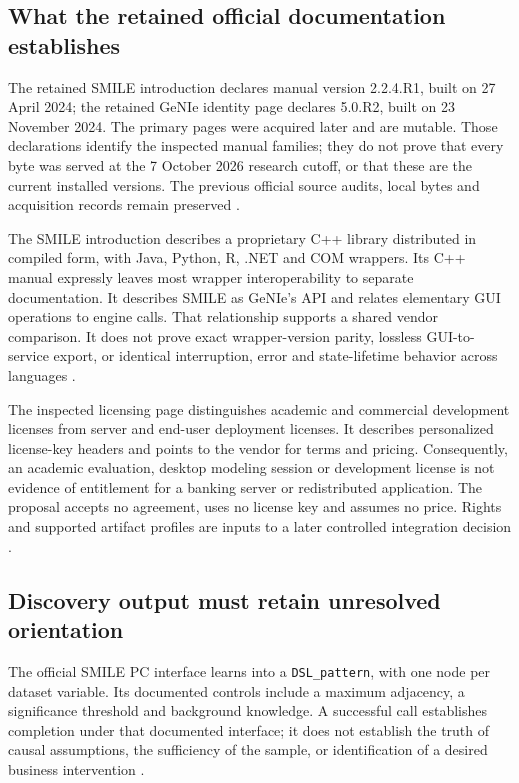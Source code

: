 \subsection{What the retained official documentation establishes}
The retained SMILE introduction declares manual version 2.2.4.R1, built on
27 April 2024; the retained GeNIe identity page declares 5.0.R2, built on
23 November 2024. The primary pages were acquired later and are mutable.
Those declarations identify the inspected manual families; they do not
prove that every byte was served at the 7 October 2026 research cutoff,
or that these are the current installed versions. The previous official
source audits, local bytes and acquisition records remain preserved
\cite{exec13_smile_intro,exec13_genie_readme,exec24_smile_choice}.

The SMILE introduction describes a proprietary C++ library distributed in
compiled form, with Java, Python, R, .NET and COM wrappers. Its C++ manual
expressly leaves most wrapper interoperability to separate documentation.
It describes SMILE as GeNIe's API and relates elementary GUI operations to
engine calls. That relationship supports a shared vendor comparison. It
does not prove exact wrapper-version parity, lossless GUI-to-service export,
or identical interruption, error and state-lifetime behavior across languages
\cite{exec13_smile_intro}.

The inspected licensing page distinguishes academic and commercial
development licenses from server and end-user deployment licenses. It
describes personalized license-key headers and points to the vendor for
terms and pricing. Consequently, an academic evaluation, desktop modeling
session or development license is not evidence of entitlement for a banking
server or redistributed application. The proposal accepts no agreement,
uses no license key and assumes no price. Rights and supported artifact
profiles are inputs to a later controlled integration decision
\cite{exec13_smile_license,exec24_smile_choice}.

\subsection{Discovery output must retain unresolved orientation}
The official SMILE PC interface learns into a \texttt{DSL\_pattern}, with
one node per dataset variable. Its documented controls include a maximum
adjacency, a significance threshold and background knowledge. A successful
call establishes completion under that documented interface; it does not
establish the truth of causal assumptions, the sufficiency of the sample,
or identification of a desired business intervention
\cite{exec13_smile_pc,exec24_smile_choice}.


